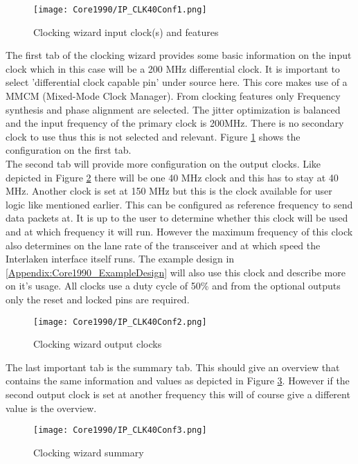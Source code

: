 	\begin{figure}[H]
		\centering
		\texttt{[image: Core1990/IP\_CLK40Conf1.png]}
		\caption{Clocking wizard input clock(s) and features}
		\label{fig:IP_CLK40Conf1}
	\end{figure}
	
	The first tab of the clocking wizard provides some basic information on the input clock which in this case will be a 200 MHz differential clock. It is important to select 'differential clock capable pin' under source here. This core makes use of a MMCM (Mixed-Mode Clock Manager). From clocking features only Frequency synthesis and phase alignment are selected. The jitter optimization is balanced and the input frequency of the primary clock is 200MHz. There is no secondary clock to use thus this is not selected and relevant. Figure \ref{fig:IP_CLK40Conf1} shows the configuration on the first tab. \\

	The second tab will provide more configuration on the output clocks. Like depicted in Figure \ref{fig:IP_CLK40Conf2} there will be one 40 MHz clock and this has to stay at 40 MHz. Another clock is set at 150 MHz but this is the clock available for user logic like mentioned earlier. This can be configured as reference frequency to send data packets at. It is up to the user to determine whether this clock will be used and at which frequency it will run. However the maximum frequency of this clock also determines on the lane rate of the transceiver and at which speed the Interlaken interface itself runs. The example design in \ref{Appendix:Core1990_ExampleDesign} will also use this clock and describe more on it's usage. All clocks use a duty cycle of 50\% and from the optional outputs only the reset and locked pins are required.
	
	\begin{figure}[H]
		\centering
		\texttt{[image: Core1990/IP\_CLK40Conf2.png]}	
		\caption{Clocking wizard output clocks}
		\label{fig:IP_CLK40Conf2}
	\end{figure} 
	
	The last important tab is the summary tab. This should give an overview that contains the same information and values as depicted in Figure \ref{fig:IP_CLK40Conf3}. However if the second output clock is set at another frequency this will of course give a different value is the overview.
		
	\begin{figure}[H]
		\centering
		\texttt{[image: Core1990/IP\_CLK40Conf3.png]}	
		\caption{Clocking wizard summary}
		\label{fig:IP_CLK40Conf3}
	\end{figure}
	
